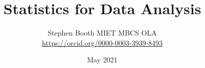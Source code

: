 \title{Statistics for Data Analysis}

\author{Stephen Booth MIET MBCS OLA \\ \url{https://orcid.org/0000-0003-3939-8493}}
\date{ May 2021}
